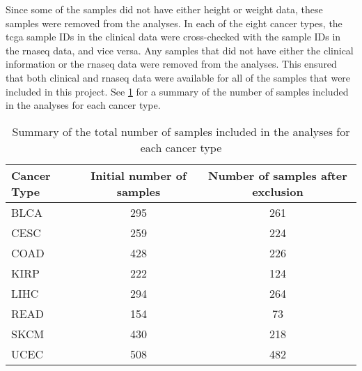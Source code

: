 Since some of the samples did not have either height or weight data, these samples were removed from the analyses.
In each of the eight cancer types, the \gls{tcga} sample IDs in the clinical data were cross-checked with the sample IDs in the \gls{rnaseq} data, and vice versa.
Any samples that did not have either the clinical information or the \gls{rnaseq} data were removed from the analyses.
This ensured that both clinical and \gls{rnaseq} data were available for all of the samples that were included in this project.
See \cref{tab:samplesize} for a summary of the number of samples included in the analyses for each cancer type.

\begin{table}[htpb]
	\caption{Summary of the total number of samples included in the analyses for each cancer type}
	\label{tab:samplesize}
	\begin{center}
		\begin{tabular}{lcc}
			Cancer Type   & Initial number of samples & Number of samples after exclusion\\
			\hline
			\hline
			\rule{0pt}{2.25ex}BLCA & 295 & 261   \\
			CESC                   & 259 & 224   \\
			COAD                   & 428 & 226   \\
			KIRP                   & 222 & 124   \\
			LIHC                   & 294 & 264   \\
			READ                   & 154 & 73    \\
			SKCM                   & 430 & 218   \\
			UCEC                   & 508 & 482   \\
			\hline
			\hline
		\end{tabular}
	\end{center}
\end{table}

